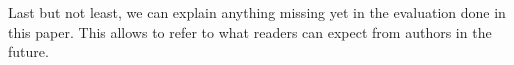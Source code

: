 \documentclass[A4,twocolumn]{article}
\begin{document}
Last but not least, we can explain anything missing yet in the evaluation
done in this paper. This allows to refer to what readers can expect from
authors in the future.

\nocite{robotron,
stonx,vice,650sim,herculessim,zib,4004,thermal1,thermal2,rojas}




\end{document}
